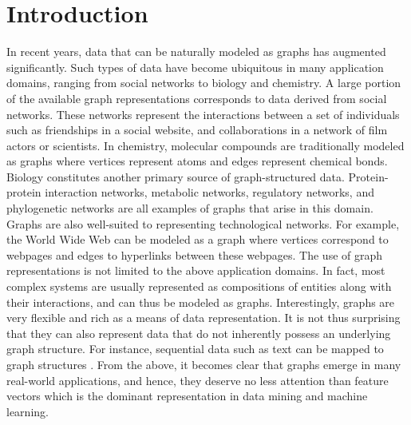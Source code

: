 \documentclass[twoside,11pt]{article}
\begin{document}
\section{Introduction}\label{Introduction}
In recent years, data that can be naturally modeled as graphs has augmented significantly.
Such types of data have become ubiquitous in many application domains, ranging from social networks to biology and chemistry.
A large portion of the available graph representations corresponds to data derived from social networks.
These networks represent the interactions between a set of individuals such as friendships in a social website, and collaborations in a network of film actors or scientists.
In chemistry, molecular compounds are traditionally modeled as graphs where vertices represent atoms and edges represent chemical bonds.
Biology constitutes another primary source of graph-structured data. Protein-protein interaction networks, metabolic networks, regulatory networks, and phylogenetic networks are all examples of graphs that arise in this domain.
Graphs are also well-suited to representing technological networks.
For example, the World Wide Web can be modeled as a graph where vertices correspond to webpages and edges to hyperlinks between these webpages.
The use of graph representations is not limited to the above application domains.
In fact, most complex systems are usually represented as compositions of entities along with their interactions, and can thus be modeled as graphs.
Interestingly, graphs are very flexible and rich as a means of data representation.
It is not thus surprising that they can also represent data that do not inherently possess an underlying graph structure.
For instance, sequential data such as text can be mapped to graph structures \cite{filippova2010multi}.
From the above, it becomes clear that graphs emerge in many real-world applications, and hence, they deserve no less attention than feature vectors which is the dominant representation in data mining and machine learning.
\end{document}
